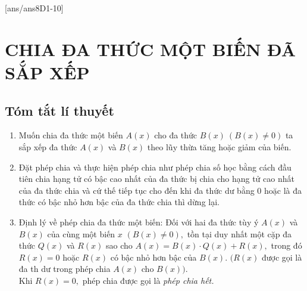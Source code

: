[ans/ans8D1-10]
\section{CHIA ĐA THỨC MỘT BIẾN ĐÃ SẮP XẾP}
\subsection{Tóm tắt lí thuyết}
\begin{enumerate}[\tickEX]
	\item Muốn chia đa thức một biến $A(x)$ cho đa thức $B(x)\ (B(x)\ne0)$ ta sắp xếp đa thức $A(x)$ và $B(x)$ theo lũy thừa tăng hoặc giảm của biến.
	\item Đặt phép chia và thực hiện phép chia như phép chia số học bằng cách đầu tiên chia hạng tử có bậc cao nhất của đa thức bị chia cho hạng tử cao nhất của đa thức chia và cứ thế tiếp tục cho đến khi đa thức dư bằng $0$  hoặc là đa thức có bậc nhỏ hơn bậc của đa thức chia thì dừng lại.
	\item Định lý về phép chia đa thức một biến: Đối với hai đa thức tùy ý $A(x)$ và $B(x)$ của cùng một biến $x$ $(B(x)\ne0),$ tồn tại  duy nhất một cặp đa thức $Q(x)$ và $R(x)$ sao cho $A(x)=B(x)\cdot Q(x)+R(x),$ trong đó $R(x)=0$ hoặc $R(x)$ có bậc nhỏ hơn bậc của $B(x).$ $(R(x)$  được gọi là đa th dư trong phép chia $A(x)$ cho $B(x)).$\\
	Khi $R(x)=0,$ phép chia được gọi là {\it phép chia hết.} 
\end{enumerate}
